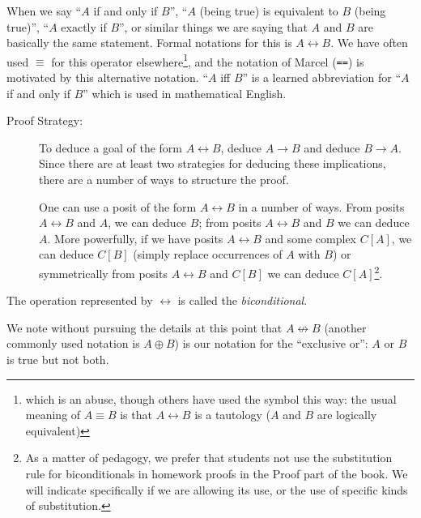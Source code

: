 \documentclass[12pt]{book}
\begin{document}
When we say ``$A$ if and only if $B$'', ``$A$ (being true) is
equivalent to $B$ (being true)'', ``$A$ exactly if $B$'', or similar
things we are saying that $A$ and $B$ are basically the same
statement.  Formal notations for this is $A \leftrightarrow B$.  We
have often used $\equiv$ for this operator elsewhere\footnote{which is an abuse, though others have used the symbol this way:  the usual meaning of $A \equiv B$ is that $A \leftrightarrow B$ is a tautology ($A$ and $B$ are logically equivalent)}, and the notation
of Marcel ({\tt ==}) is motivated by this alternative notation.  ``$A$
iff $B$'' is a learned abbreviation for ``$A$ if and only if $B$''
which is used in mathematical English.

\begin{description}

\item[Proof Strategy:]

To deduce a goal of the form $A \leftrightarrow B$, deduce $A \rightarrow B$ and
deduce $B \rightarrow A$.  Since there are at least two strategies for deducing these implications, there are a number of ways to structure the proof.

One can use a posit of the form $A \leftrightarrow B$ in a number of ways.
From posits $A \leftrightarrow B$ and $A$, we can deduce $B$; from posits $A
\leftrightarrow B$ and $B$ we can deduce $A$.  More powerfully, if we have
posits $A \leftrightarrow B$ and some complex $C[A]$, we can deduce $C[B]$
(simply replace occurrences of $A$ with $B$) or symmetrically from
posits $A \leftrightarrow B$ and $C[B]$ we can deduce $C[A]$\footnote{As a matter of pedagogy, we prefer that students not use the substitution rule for biconditionals in homework proofs in the Proof part of the book.  We will indicate specifically if we are allowing its use, or the use of specific kinds of substitution.}.

\end{description}

The operation represented by $\leftrightarrow$ is called
the {\em biconditional\/}.

We note without pursuing the details at this point that $A \not\leftrightarrow
B$ (another commonly used notation is $A \oplus B$) is our notation
for the ``exclusive or'':  $A$ or $B$ is true but not both.
\end{document}
